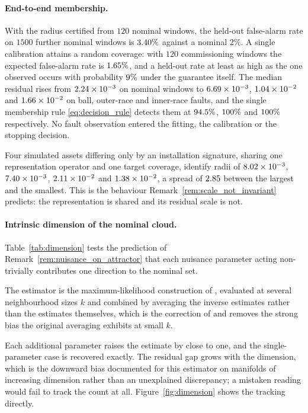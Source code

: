 \documentclass[a4paper]{cas-sc}
\begin{document}
\paragraph{End-to-end membership.}
With the radius certified from \(120\) nominal windows, the held-out
false-alarm rate on \(1500\) further nominal windows is \(3.40\%\)
against a nominal \(2\%\). A single calibration attains a random coverage:
with \(120\) commissioning windows the expected false-alarm rate is
\(1.65\%\), and a held-out rate at least as high as the one observed
occurs with probability \(9\%\) under the guarantee itself. The median residual rises from \(2.24\times10^{-3}\) on
nominal windows to \(6.69\times10^{-3}\), \(1.04\times10^{-2}\) and
\(1.66\times10^{-2}\) on ball, outer-race and inner-race faults, and the
single membership rule \eqref{eq:decision_rule} detects them at \(94.5\%\),
\(100\%\) and \(100\%\) respectively. No fault observation entered the
fitting, the calibration or the stopping decision.

Four simulated assets differing only by an installation signature, sharing one
representation operator and one target coverage, identify radii of
\(8.02\times10^{-3}\), \(7.40\times10^{-3}\), \(2.11\times10^{-2}\) and
\(1.38\times10^{-2}\), a spread of \(2.85\) between the largest and the
smallest. This is the behaviour Remark~\ref{rem:scale_not_invariant}
predicts: the representation is shared and its residual scale is not.

\paragraph{Intrinsic dimension of the nominal cloud.}
Table~\ref{tab:dimension} tests the prediction of
Remark~\ref{rem:nuisance_on_attractor} that each nuisance parameter acting
non-trivially contributes one direction to the nominal set.



The estimator is the maximum-likelihood construction of \citet{levina2004},
evaluated at several neighbourhood sizes \(k\) and combined by averaging the
inverse estimates rather than the estimates themselves, which is the
correction of \citet{mackay2005dimension} and removes the strong bias the
original averaging exhibits at small \(k\).

Each additional parameter raises the estimate by close to one, and the
single-parameter case is recovered exactly. The residual gap grows with the
dimension, which is the downward bias documented for this estimator on
manifolds of increasing dimension rather than an unexplained discrepancy; a
mistaken reading would fail to track the count at
all. Figure~\ref{fig:dimension} shows the tracking directly.
\end{document}

